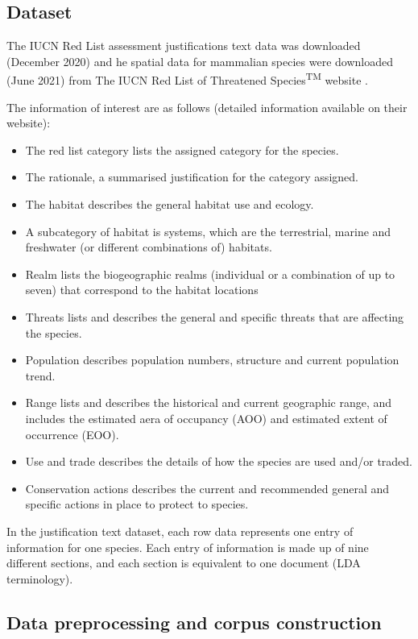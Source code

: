 \subsection{Dataset}

The IUCN Red List assessment justifications text data was downloaded (December 2020) and he spatial data for mammalian species were downloaded (June 2021) from The IUCN Red List of Threatened Species\textsuperscript{TM} website \parencite{iucn2021}. 

The information of interest are as follows (detailed information available on their website):
\begin{itemize}
    \item The red list category lists the assigned category for the species. 
    \item The rationale, a summarised justification for the category assigned. 
    \item The habitat describes the general habitat use and ecology. 
    \item A subcategory of habitat is systems, which are the terrestrial, marine and freshwater (or different combinations of) habitats.
    \item Realm lists the biogeographic realms (individual or a combination of up to seven) that correspond to the habitat locations
    \item Threats lists and describes the general and specific threats that are affecting the species. 
    \item Population describes population numbers, structure and current population trend. 
    \item Range lists and describes the historical and current geographic range, and includes the estimated aera of occupancy (AOO) and estimated extent of occurrence (EOO). 
    \item Use and trade describes the details of how the species are used and/or traded.
    \item Conservation actions describes the current and recommended general and specific actions in place to protect to species. 
\end{itemize}

In the justification text dataset, each row data represents one entry of information for one species. Each entry of information is made up of nine different sections, and each section is equivalent to one document (LDA terminology).

\subsection{Data preprocessing and corpus construction}

